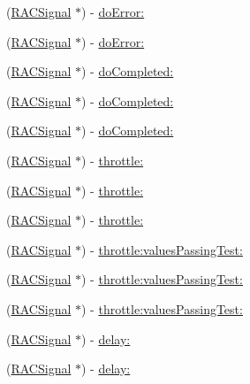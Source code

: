 \begin{DoxyCompactItemize}
(\mbox{\hyperlink{interface_r_a_c_signal}{R\+A\+C\+Signal}} $\ast$) -\/ \mbox{\hyperlink{interface_r_a_c_signal_ac97a1fc7c03123a75746f2602b7444b4}{do\+Error\+:}}
\item 
(\mbox{\hyperlink{interface_r_a_c_signal}{R\+A\+C\+Signal}} $\ast$) -\/ \mbox{\hyperlink{interface_r_a_c_signal_ac97a1fc7c03123a75746f2602b7444b4}{do\+Error\+:}}
\item 
(\mbox{\hyperlink{interface_r_a_c_signal}{R\+A\+C\+Signal}} $\ast$) -\/ \mbox{\hyperlink{interface_r_a_c_signal_af88fe4c330bad925ed164ad8f12bdcc8}{do\+Completed\+:}}
\item 
(\mbox{\hyperlink{interface_r_a_c_signal}{R\+A\+C\+Signal}} $\ast$) -\/ \mbox{\hyperlink{interface_r_a_c_signal_af88fe4c330bad925ed164ad8f12bdcc8}{do\+Completed\+:}}
\item 
(\mbox{\hyperlink{interface_r_a_c_signal}{R\+A\+C\+Signal}} $\ast$) -\/ \mbox{\hyperlink{interface_r_a_c_signal_af88fe4c330bad925ed164ad8f12bdcc8}{do\+Completed\+:}}
\item 
(\mbox{\hyperlink{interface_r_a_c_signal}{R\+A\+C\+Signal}} $\ast$) -\/ \mbox{\hyperlink{interface_r_a_c_signal_a2542ae804d05ec734d0f4d2fa8c3ac93}{throttle\+:}}
\item 
(\mbox{\hyperlink{interface_r_a_c_signal}{R\+A\+C\+Signal}} $\ast$) -\/ \mbox{\hyperlink{interface_r_a_c_signal_a2542ae804d05ec734d0f4d2fa8c3ac93}{throttle\+:}}
\item 
(\mbox{\hyperlink{interface_r_a_c_signal}{R\+A\+C\+Signal}} $\ast$) -\/ \mbox{\hyperlink{interface_r_a_c_signal_a2542ae804d05ec734d0f4d2fa8c3ac93}{throttle\+:}}
\item 
(\mbox{\hyperlink{interface_r_a_c_signal}{R\+A\+C\+Signal}} $\ast$) -\/ \mbox{\hyperlink{interface_r_a_c_signal_a0310fbee83b4ca1b1daca25daf24f41b}{throttle\+:values\+Passing\+Test\+:}}
\item 
(\mbox{\hyperlink{interface_r_a_c_signal}{R\+A\+C\+Signal}} $\ast$) -\/ \mbox{\hyperlink{interface_r_a_c_signal_a0310fbee83b4ca1b1daca25daf24f41b}{throttle\+:values\+Passing\+Test\+:}}
\item 
(\mbox{\hyperlink{interface_r_a_c_signal}{R\+A\+C\+Signal}} $\ast$) -\/ \mbox{\hyperlink{interface_r_a_c_signal_a0310fbee83b4ca1b1daca25daf24f41b}{throttle\+:values\+Passing\+Test\+:}}
\item 
(\mbox{\hyperlink{interface_r_a_c_signal}{R\+A\+C\+Signal}} $\ast$) -\/ \mbox{\hyperlink{interface_r_a_c_signal_adc28e5c64d2e6ec8c5ab8465fa6c89b4}{delay\+:}}
\item 
(\mbox{\hyperlink{interface_r_a_c_signal}{R\+A\+C\+Signal}} $\ast$) -\/ \mbox{\hyperlink{interface_r_a_c_signal_adc28e5c64d2e6ec8c5ab8465fa6c89b4}{delay\+:}}

\end{DoxyCompactItemize}
